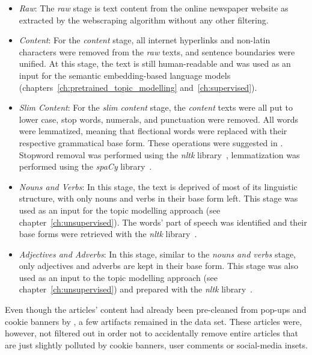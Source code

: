\begin{itemize}
    \item \textit{Raw}: The \textit{raw} stage is text content from the online newspaper website as extracted by the webscraping algorithm without any other filtering.
    \item \textit{Content}: For the \textit{content} stage, all internet hyperlinks and non-latin characters were removed from the \textit{raw} texts, and sentence boundaries were unified. At this stage, the text is still human-readable and was used as an input for the semantic embedding-based language models (chapters~\ref{ch:pretrained_topic_modelling} and~\ref{ch:supervised}).
    \item \textit{Slim Content}: For the \textit{slim content} stage, the \textit{content} texts were all put to lower case, stop words, numerals, and punctuation were removed. All words were lemmatized, meaning that flectional words were replaced with their respective grammatical base form. These operations were suggested in \textcite[p. 254]{vajjala_practical_2020}. Stopword removal was performed using the \textit{nltk} library~\autocite{bird_natural_2019}, lemmatization was performed using the \textit{spaCy} library~\autocite{spacy_spacy_nodate}.
    \item \textit{Nouns and Verbs}: In this stage, the text is deprived of most of its linguistic structure, with only nouns and verbs in their base form left. This stage was used as an input for the topic modelling approach (see chapter~\ref{ch:unsupervised}). The words' part of speech was identified and their base forms were retrieved with the \textit{nltk} library~\autocite{bird_natural_2019}.
    \item \textit{Adjectives and Adverbs}: In this stage, similar to the \textit{nouns and verbs} stage, only adjectives and adverbs are kept in their base form. This stage was also used as an input to the topic modelling approach (see chapter~\ref{ch:unsupervised}) and prepared with the \textit{nltk} library~\autocite{bird_natural_2019}.
\end{itemize}

Even though the articles' content had already been pre-cleaned from pop-ups and cookie banners by \textcite{fenske_using_2022}, a few artifacts remained in the data set. These articles were, however, not filtered out in order not to accidentally remove entire articles that are just slightly polluted by cookie banners, user comments or social-media insets.


